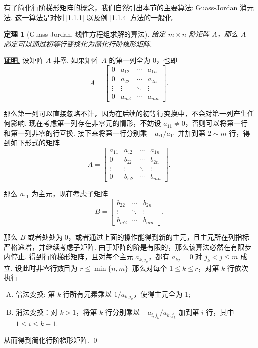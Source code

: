 \documentclass[10pt,openany]{article}
\theoremstyle{thmstyle} %
\newtheorem{theorem}{定理}[subsection]
\theoremstyle{defstyle} %
\theoremstyle{prostyle} %
\theoremstyle{exastyle}
\theoremstyle{remstyle}
\renewenvironment{proof}[1][证明]{\par\underline{\textbf{#1.}} \;\fangsong}{\qed\par}
\begin{document}
有了简化行阶梯形矩阵的概念，我们自然引出本节的主要算法: Guass-Jordan 消元法. 这一算法是对例 \ref{1.1.1} 以及例 \ref{1.1.4} 方法的一般化.

\begin{theorem}[Guass-Jordan, 线性方程组求解的算法]	\label{1.1.8}
	给定 \( m \times n \) 阶矩阵 \( A \)，那么 \( A \) 必定可以通过初等行变换化为简化行阶梯形矩阵.

\end{theorem}


\begin{proof}
	设矩阵 \( A \) 非零. 如果矩阵 \( A \) 的第一列全为 0，也即
	\[ A=\begin{bmatrix}
		0 & a_{12} & \cdots & a_{1n} \\
		0 & a_{22} & \cdots & a_{2n} \\
		\vdots & \vdots & \ddots & \vdots \\
		0 & a_{m2} & \cdots & a_{mn}
	\end{bmatrix}. \]
	
	那么第一列可以直接忽略不计，因为在后续的初等行变换中，不会对第一列产生任何影响. 现在考虑第一列存在非零元的情形，不妨设 \( a_{11} \neq 0 \)，否则可以将第一行和第一列非零的行互换. 接下来将第一行分别乘 \( -a_{i1}/a_{11} \) 并加到第 \( 2 \sim m \) 行，得到如下形式的矩阵
	\[ A=\begin{bmatrix}
		a_{11} & a_{12} & \cdots & a_{1n} \\
		0 & b_{22} & \cdots & b_{2n} \\
		\vdots & \vdots & \ddots & \vdots \\
		0 & b_{m2} & \cdots & b_{mn}
	\end{bmatrix}. \] 
	
	那么 \( a_{11} \) 为主元，现在考虑子矩阵
	\[ B=\begin{bmatrix}
		 b_{22} & \cdots & b_{2n} \\
		 \vdots & \ddots & \vdots \\
		 b_{m2} & \cdots & b_{mn}
	\end{bmatrix}. \]
	
	那么 \( B \) 或者处处为 0，或者通过上面的操作能得到新的主元，且主元所在列指标严格递增，并继续考虑子矩阵. 由于矩阵的阶是有限的，那么该算法必然在有限步内停止. 得到行阶梯形矩阵，且对每个主元 \( a_{k,j_k} \)，都有 \( a_{kj}=0 \) 对 \( j_k<j \leq m  \) 成立. 设此时非零行数目为 \(  r \leq \min\{ n,m \} \). 那么对每个 \( 1 \leq k \leq r \)，对第 \( k \) 行依次执行
	\begin{enumerate}[(A)]
		\item 倍法变换: 第 \( k \) 行所有元素乘以 \( 1/a_{k,j_k} \)，使得主元全为 1;
		\item 消法变换：对 \( k>1 \)，将第 \( k \) 行分别乘以 \( -a_{i,j_k}/a_{k,j_k} \) 加到第 \( i \) 行，其中 \( 1 \leq i \leq k-1 \).
	\end{enumerate}
	
	从而得到简化行阶梯形矩阵.
\end{proof}
\end{document}
